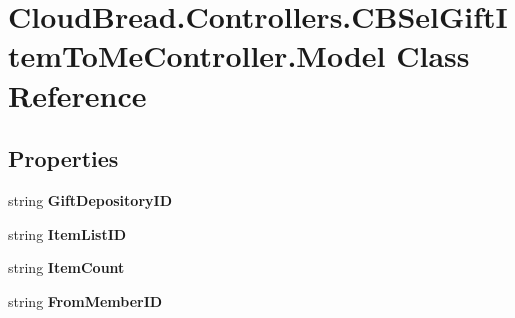 \hypertarget{class_cloud_bread_1_1_controllers_1_1_c_b_sel_gift_item_to_me_controller_1_1_model}{}\section{Cloud\+Bread.\+Controllers.\+C\+B\+Sel\+Gift\+Item\+To\+Me\+Controller.\+Model Class Reference}
\label{class_cloud_bread_1_1_controllers_1_1_c_b_sel_gift_item_to_me_controller_1_1_model}
\subsection*{Properties}
\begin{DoxyCompactItemize}
\item 
string {\bfseries Gift\+Depository\+ID}\hypertarget{class_cloud_bread_1_1_controllers_1_1_c_b_sel_gift_item_to_me_controller_1_1_model_a2413c1358d7c1bf74e2164820b9be8ef}{}\label{class_cloud_bread_1_1_controllers_1_1_c_b_sel_gift_item_to_me_controller_1_1_model_a2413c1358d7c1bf74e2164820b9be8ef}

\item 
string {\bfseries Item\+List\+ID}\hypertarget{class_cloud_bread_1_1_controllers_1_1_c_b_sel_gift_item_to_me_controller_1_1_model_a25dcf0f1aa5ccf159032a147bd69c744}{}\label{class_cloud_bread_1_1_controllers_1_1_c_b_sel_gift_item_to_me_controller_1_1_model_a25dcf0f1aa5ccf159032a147bd69c744}

\item 
string {\bfseries Item\+Count}\hypertarget{class_cloud_bread_1_1_controllers_1_1_c_b_sel_gift_item_to_me_controller_1_1_model_a88fe3ba53e74f799bd49397a42f997c8}{}\label{class_cloud_bread_1_1_controllers_1_1_c_b_sel_gift_item_to_me_controller_1_1_model_a88fe3ba53e74f799bd49397a42f997c8}

\item 
string {\bfseries From\+Member\+ID}\hypertarget{class_cloud_bread_1_1_controllers_1_1_c_b_sel_gift_item_to_me_controller_1_1_model_a01b8b2a0cc41037154c82ca7912c1886}{}\label{class_cloud_bread_1_1_controllers_1_1_c_b_sel_gift_item_to_me_controller_1_1_model_a01b8b2a0cc41037154c82ca7912c1886}


\end{DoxyCompactItemize}
